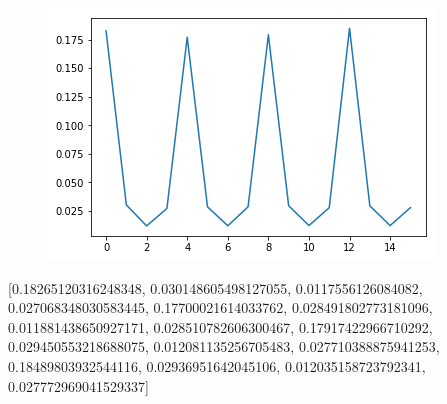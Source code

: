 \begin{figure}[H]
\centering \includegraphics[width=0.9\linewidth]{img/shorlossless.png}
\caption{}
\end{figure}

[0.18265120316248348,
 0.030148605498127055,
 0.0117556126084082,
 0.027068348030583445,
 0.17700021614033762,
 0.028491802773181096,
 0.011881438650927171,
 0.028510782606300467,
 0.17917422966710292,
 0.029450553218688075,
 0.012081135256705483,
 0.027710388875941253,
 0.18489803932544116,
 0.02936951642045106,
 0.012035158723792341,
 0.027772969041529337]

